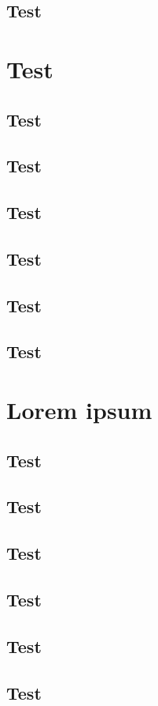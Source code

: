\documentclass[b5paper,twoside,openright]{scrbook}
\begin{document}
\subsection{Test}
\section{Test}
\subsection{Test}
\subsection{Test}
\subsection{Test}
\subsection{Test}
\subsection{Test}
\subsection{Test}

\section{Lorem ipsum}

\subsection{Test}
\subsection{Test}
\subsection{Test}
\subsection{Test}
\subsection{Test}
\subsection{Test}
\end{document}

